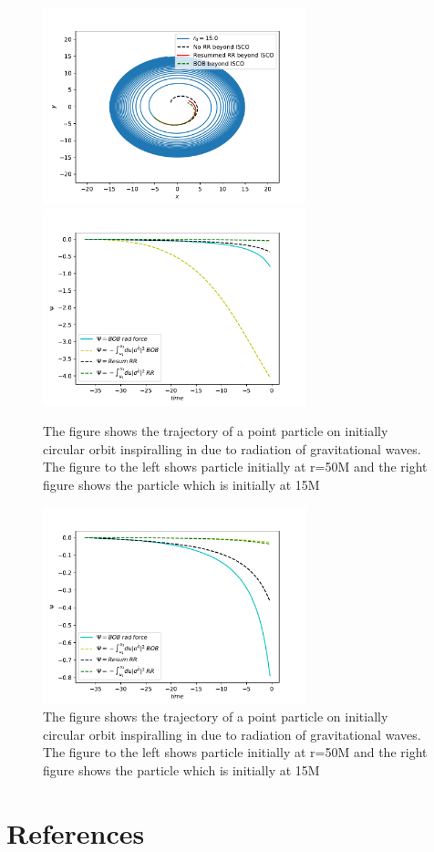 \documentclass[prd,preprintnumbers,onecolumn,eqsecnum,floatfix,letter]{revtex4}
\begin{document}
\begin{figure}
	\includegraphics[width=3.0in]{../plots/OrbitEOB_Vs_BOB_beyodISCO.pdf}
	\includegraphics[width=3.0in]{../plots/Psi2EOBHamiltonia_Comparision.pdf}
	\caption{The figure shows the trajectory of a point particle on initially circular orbit inspiralling in due to radiation of gravitational waves. The figure to the left shows particle initially at r=50M and the right figure shows the particle which is initially at 15M}
	\label{fig:BoBpsiCOMP}
\end{figure} 
\begin{figure}
	\includegraphics[width=3.0in]{../plots/Psi2EOBHamiltonia_Comparision_usingResumModel.pdf}
	\caption{The figure shows the trajectory of a point particle on initially circular orbit inspiralling in due to radiation of gravitational waves. The figure to the left shows particle initially at r=50M and the right figure shows the particle which is initially at 15M}
	\label{fig:BoBFig}
\end{figure} 
\section*{References}



\end{document}

